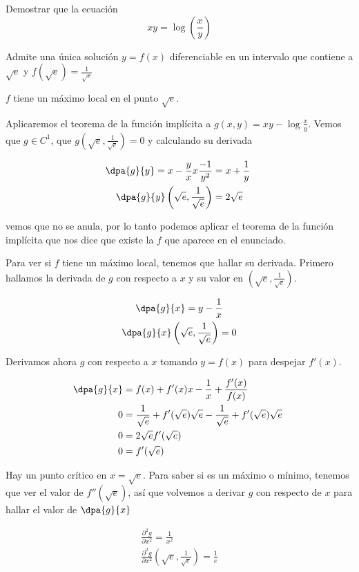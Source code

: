 \begin{problem}[24] Demostrar que la ecuación
\[xy = \log \left(\frac{x}{y}\right)\]

\ppart Admite una única solución $y=f(x)$ diferenciable en un intervalo que contiene a $\sqrt{e}$ y $f(\sqrt{e}) = \frac{1}{\sqrt{e}}$

\ppart $f$ tiene un máximo local en el punto $\sqrt{e}$.

\solution

\spart
Aplicaremos el teorema de la función implícita a $g(x,y)=xy - \log \frac{x}{y}$. Vemos que $g∈C^1$, que $g\left(\sqrt{e}, \frac{1}{\sqrt{e}}\right) = 0$ y calculando su derivada

\begin{gather*}
 \dpa{g}{y} = x - \frac{y}{x} x \frac{-1}{y^2} = x + \frac{1}{y} \\
 \dpa{g}{y}\left(\sqrt{e}, \frac{1}{\sqrt{e}}\right)  = 2 \sqrt{e}
 \end{gather*}

 vemos que no se anula, por lo tanto podemos aplicar el teorema de la función implícita que nos dice que existe la $f$ que aparece en el enunciado.

\spart Para ver si $f$ tiene un máximo local, tenemos que hallar su derivada. Primero hallamos la derivada de $g$ con respecto a $x$ y su valor en $\left(\sqrt{e}, \frac{1}{\sqrt{e}}\right)$.

\begin{gather*}
 \dpa{g}{x} = y - \frac{1}{x} \\
 \dpa{g}{x}\left(\sqrt{e}, \frac{1}{\sqrt{e}}\right)  = 0
 \end{gather*}

Derivamos ahora $g$ con respecto a $x$ tomando $y=f(x)$ para despejar $f'(x)$.

\begin{align*}
\dpa{g}{x} &= f(x) +  f'(x)x - \frac{1}{x} + \frac{f'(x)}{f(x)} \\
0 &= \frac{1}{\sqrt{e}} + f'(\sqrt{e}) \sqrt{e} - \frac{1}{\sqrt{e}} + f'(\sqrt{e})\sqrt{e} \\
0 &= 2\sqrt{e}f'(\sqrt{e}) \\
0 &= f'(\sqrt{e})
\end{align*}

Hay un punto crítico en $x = \sqrt{e}$. Para saber si es un máximo o mínimo, tenemos que ver el valor de $f''(\sqrt{e})$, así que volvemos a derivar $g$ con respecto de $x$ para hallar el valor de $\dpa{g}{x}$

\begin{gather*}
\frac{∂^2g}{∂x^2} = \frac{1}{x^2} \\
\frac{∂^2g}{∂x^2}\left(\sqrt{e}, \frac{1}{\sqrt{e}}\right) = \frac{1}{e}
\end{gather*}


\end{problem}
